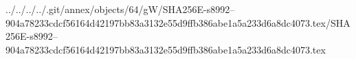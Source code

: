 ../../../../.git/annex/objects/64/gW/SHA256E-s8992--904a78233cdcf56164d42197bb83a3132e55d9ffb386abe1a5a233d6a8dc4073.tex/SHA256E-s8992--904a78233cdcf56164d42197bb83a3132e55d9ffb386abe1a5a233d6a8dc4073.tex